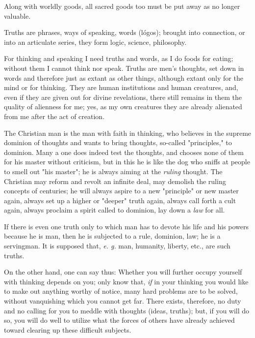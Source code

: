 Along with worldly goods, all sacred goods too must be put away as no longer 
valuable.

Truths are phrases, ways of speaking, words (l\'ogos); brought into 
connection, or into an articulate series, they form logic, science, 
philosophy.

For thinking and speaking I need truths and words, as I do foods for eating; 
without them I cannot think nor speak. Truths are men's thoughts, set down in 
words and therefore just as extant as other things, although extant only for 
the mind or for thinking. They are human institutions and human creatures, 
and, even if they are given out for divine revelations, there still remains in 
them the quality of alienness for me; yes, as my own creatures they are 
already alienated from me after the act of creation.

The Christian man is the man with faith in thinking, who believes in the 
supreme dominion of thoughts and wants to bring thoughts, so-called 
"{}principles,"{} to dominion. Many a one does indeed test the thoughts, and 
chooses none of them for his master without criticism, but in this he is like 
the dog who sniffs at people to smell out "{}his master"{}; he is always 
aiming at the \textit{ruling} thought. The Christian may reform and revolt an 
infinite deal, may demolish the ruling concepts of centuries; he will always 
aspire to a new "{}principle"{} or new master again, always set up a higher or 
"{}deeper"{} truth again, always call forth a cult again, always proclaim a 
spirit called to dominion, lay down a \textit{law} for all.

If there is even one truth only to which man has to devote his life and his 
powers because he is man, then he is subjected to a rule, dominion, law; he is 
a servingman. It is supposed that, \textit{e. g.} man, humanity, liberty, 
etc., are such truths.

On the other hand, one can say thus: Whether you will further occupy yourself 
with thinking depends on you; only know that, \textit{if} in your thinking you 
would like to make out anything worthy of notice, many hard problems are to be 
solved, without vanquishing which you cannot get far. There exists, therefore, 
no duty and no calling for you to meddle with thoughts (ideas, truths); but, 
if you will do so, you will do well to utilize what the forces of others have 
already achieved toward clearing up these difficult subjects.

